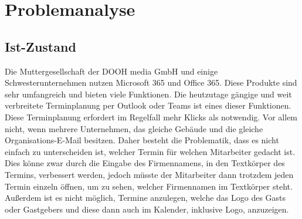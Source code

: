 


\newpage
\section{Problemanalyse}\label{sec:problemanalyse}
\subsection{Ist-Zustand}\label{subsec:ist-zustand}
Die Muttergesellschaft der DOOH media GmbH und einige Schwesterunternehmen nutzen Microsoft 365 und Office 365.
Diese Produkte sind sehr umfangreich und bieten viele Funktionen.
Die heutzutage gängige und weit verbreitete Terminplanung per Outlook oder Teams ist eines dieser Funktionen.
Diese Terminplanung erfordert im Regelfall mehr Klicks als notwendig.
Vor allem nicht, wenn mehrere Unternehmen, das gleiche Gebäude und die gleiche Organisations-E-Mail besitzen.
Daher besteht die Problematik, dass es nicht einfach zu unterscheiden ist, welcher Termin für welchen Mitarbeiter gedacht ist.
Dies könne zwar durch die Eingabe des Firmennamens, in den Textkörper des Termins, verbessert werden, jedoch müsste der Mitarbeiter dann trotzdem jeden Termin einzeln öffnen, um zu sehen, welcher Firmennamen im Textkörper steht.
\newline
Außerdem ist es nicht möglich, Termine anzulegen, welche das Logo des Gasts oder Gastgebers und diese dann auch im Kalender, inklusive Logo, anzuzeigen.
